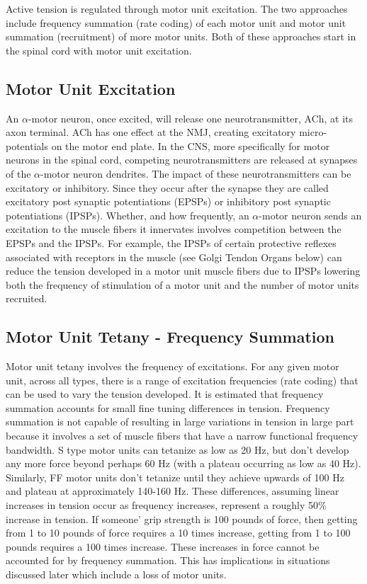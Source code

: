 Active tension is regulated through motor unit excitation. The two approaches include frequency summation (rate coding) of each motor unit and motor unit summation (recruitment) of more motor units. Both of these approaches start in the spinal cord with motor unit excitation.

\subsection{Motor Unit Excitation}

An $\alpha$-motor neuron, once excited, will release one neurotransmitter, ACh, at its axon terminal. ACh has one effect at the NMJ, creating excitatory micro-potentials on the motor end plate. In the CNS, more specifically for motor neurons in the spinal cord, competing neurotransmitters are released at synapses of the $\alpha$-motor neuron dendrites. The impact of these neurotransmitters can be excitatory or inhibitory. Since they occur after the synapse they are called excitatory post synaptic potentiations (EPSPs) or inhibitory post synaptic potentiations (IPSPs). Whether, and how frequently, an $\alpha$-motor neuron sends an excitation to the muscle fibers it innervates involves competition between the EPSPs and the IPSPs. For example, the IPSPs of certain protective reflexes associated with receptors in the muscle (see Golgi Tendon Organs below) can reduce the tension developed in a motor unit muscle fibers due to IPSPs lowering both the frequency of stimulation of a motor unit and the number of motor units recruited.

\subsection{Motor Unit Tetany - Frequency Summation}

Motor unit tetany involves the frequency of excitations. For any given motor unit, across all types, there is a range of excitation frequencies (rate coding) that can be used to vary the tension developed. It is estimated that frequency summation accounts for small fine tuning differences in tension. Frequency summation is not capable of resulting in large variations in tension in large part because it involves a set of muscle fibers that have a narrow functional frequency bandwidth. S type motor units can tetanize as low as 20 Hz, but don't develop any more force beyond perhaps 60 Hz (with a plateau occurring as low as 40 Hz). Similarly, FF motor units don't tetanize until they achieve upwards of 100 Hz and plateau at approximately 140-160 Hz. These differences, assuming linear increases in tension occur as frequency increases, represent a roughly 50\% increase in tension. If someone' grip strength is 100 pounds of force, then getting from 1 to 10 pounds of force requires a 10 times increase, getting from 1 to 100 pounds requires a 100 times increase. These increases in force cannot be accounted for by frequency summation. This has implications in situations discussed later which include a loss of motor units.

